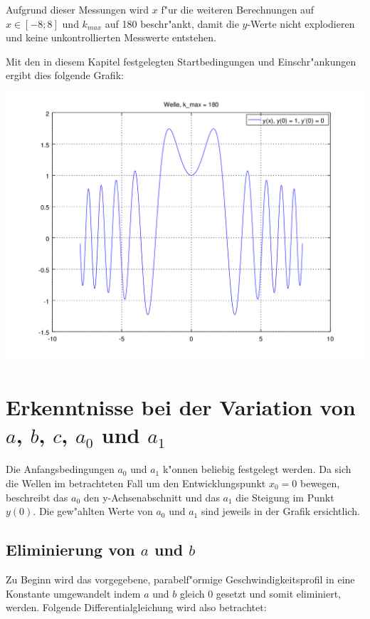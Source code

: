 \begin{refsection}
Aufgrund dieser Messungen wird $x$ f"ur die weiteren Berechnungen auf $x \in 
[-8;8]$ und $k_{max}$ auf 180 beschr"ankt, damit die $y$-Werte nicht 
explodieren und keine unkontrollierten Messwerte entstehen.

Mit den in diesem Kapitel festgelegten Startbedingungen und Einschr"ankungen 
ergibt dies folgende Grafik:
\begin{center}
	\includegraphics[scale=0.5]{./wellen/octave/images/kmax/ak180-88wave.png}
\end{center}

\section{Erkenntnisse bei der Variation von \texorpdfstring{$a$}{a}, 
\texorpdfstring{$b$}{b}, \texorpdfstring{$c$}{c}, \texorpdfstring{$a_0$}{a0} 
und \texorpdfstring{$a_1$}{a1}}

Die Anfangsbedingungen $a_0$ und $a_1$ k"onnen beliebig festgelegt werden. Da 
sich die Wellen im betrachteten Fall um den Entwicklungspunkt $x_0=0$ bewegen, 
beschreibt das $a_0$ den y-Achsenabschnitt und das $a_1$ die Steigung im Punkt 
$y(0)$. Die gew"ahlten Werte von $a_0$ und $a_1$ sind jeweils in der Grafik 
ersichtlich.

\subsection{Eliminierung von $a$ und $b$}

Zu Beginn wird das vorgegebene, parabelf"ormige Geschwindigkeitsprofil in eine 
Konstante umgewandelt indem $a$ und $b$ gleich $0$ gesetzt und somit 
eliminiert, werden. Folgende Differentialgleichung wird also betrachtet:


\end{refsection}
